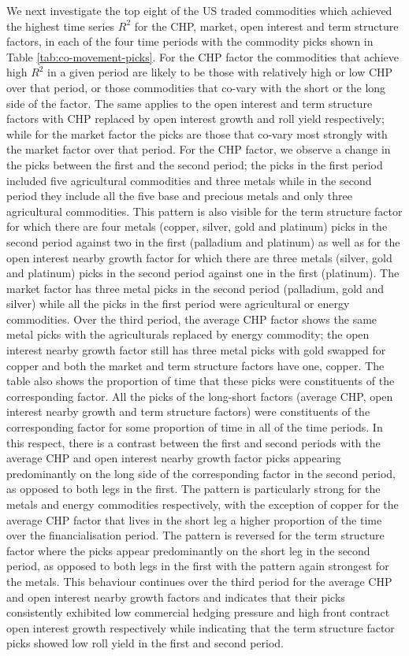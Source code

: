 \documentclass[]{elsarticle} %
\begin{document}
We next investigate the top eight of the US traded commodities which achieved the highest time series \(R^{2}\) for the CHP, market, open interest and term structure factors, in each of the four time periods with the commodity picks shown in Table \ref{tab:co-movement-picks}. For the CHP factor the commodities that achieve high \(R^{2}\) in a given period are likely to be those with relatively high or low CHP over that period, or those commodities that co-vary with the short or the long side of the factor. The same applies to the open interest and term structure factors with CHP replaced by open interest growth and roll yield respectively; while for the market factor the picks are those that co-vary most strongly with the market factor over that period. For the CHP factor, we observe a change in the picks between the first and the second period; the picks in the first period included five agricultural commodities and three metals while in the second period they include all the five base and precious metals and only three agricultural commodities. This pattern is also visible for the term structure factor for which there are four metals (copper, silver, gold and platinum) picks in the second period against two in the first (palladium and platinum) as well as for the open interest nearby growth factor for which there are three metals (silver, gold and platinum) picks in the second period against one in the first (platinum). The market factor has three metal picks in the second period (palladium, gold and silver) while all the picks in the first period were agricultural or energy commodities. Over the third period, the average CHP factor shows the same metal picks with the agriculturals replaced by energy commodity; the open interest nearby growth factor still has three metal picks with gold swapped for copper and both the market and term structure factors have one, copper. The table also shows the proportion of time that these picks were constituents of the corresponding factor. All the picks of the long-short factors (average CHP, open interest nearby growth and term structure factors) were constituents of the corresponding factor for some proportion of time in all of the time periods. In this respect, there is a contrast between the first and second periods with the average CHP and open interest nearby growth factor picks appearing predominantly on the long side of the corresponding factor in the second period, as opposed to both legs in the first. The pattern is particularly strong for the metals and energy commodities respectively, with the exception of copper for the average CHP factor that lives in the short leg a higher proportion of the time over the financialisation period. The pattern is reversed for the term structure factor where the picks appear predominantly on the short leg in the second period, as opposed to both legs in the first with the pattern again strongest for the metals. This behaviour continues over the third period for the average CHP and open interest nearby growth factors and indicates that their picks consistently exhibited low commercial hedging pressure and high front contract open interest growth respectively while indicating that the term structure factor picks showed low roll yield in the first and second period.
\end{document}
